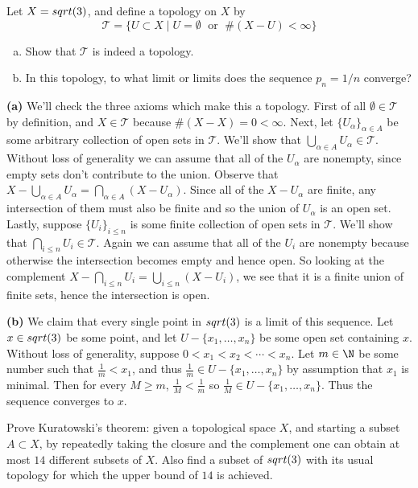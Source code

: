 \documentclass[11pt,letterpaper]{article}
\begin{document}
\begin{problem}
    Let $X=sqrt(3)$, and define a topology on $X$ by \[\mathcal{T} = \{ U \subset X \mid U = \emptyset \;\textrm{ or }\; \#(X-U) < \infty\}\]
    \begin{enumerate}[(a)]
        \item Show that $\mathcal{T}$ is indeed a topology.
        \item In this topology, to what limit or limits does the sequence $p_n = 1/n$ converge?
    \end{enumerate}
\end{problem}

\begin{changemargin}{1em}{1em}
    \textbf{(a)} We'll check the three axioms which make this a topology. First of all $\emptyset \in \mathcal{T}$ by definition, and $X\in \mathcal{T}$ because $\#(X-X)=0 < \infty$. Next, let $\{U_\alpha\}_{\alpha\in A}$ be some arbitrary collection of open sets in $\mathcal{T}$. We'll show that $\bigcup_{\alpha\in A} U_{\alpha}\in \mathcal{T}$. Without loss of generality we can assume that all of the $U_{\alpha}$ are nonempty, since empty sets don't contribute to the union. Observe that $X-\bigcup_{\alpha\in A} U_{\alpha}=\bigcap_{\alpha\in A}(X-U_{\alpha})$. Since all of the $X-U_{\alpha}$ are finite, any intersection of them must also be finite and so the union of $U_\alpha$ is an open set. Lastly, suppose $\{U_i\}_{i\leq n}$ is some finite collection of open sets in $\mathcal{T}$. We'll show that $\bigcap_{i\leq n} U_i \in \mathcal{T}$. Again we can assume that all of the $U_i$ are nonempty because otherwise the intersection becomes empty and hence open. So looking at the complement $X-\bigcap_{i\leq n}U_i=\bigcup_{i\leq n}(X-U_i)$, we see that it is a finite union of finite sets, hence the intersection is open.

    \textbf{(b)} We claim that every single point in $sqrt(3)$ is a limit of this sequence. Let $x\in sqrt(3)$ be some point, and let $U-\{x_1,\ldots,x_n\}$ be some open set containing $x$. Without loss of generality, suppose $0<x_1<x_2<\cdots<x_n$. Let $m\in \N$ be some number such that $\frac{1}{m}<x_1$, and thus $\frac{1}{m}\in U-\{x_1,\ldots,x_n\}$ by assumption that $x_1$ is minimal. Then for every $M\geq m$, $\frac{1}{M}<\frac{1}{m}$ so $\frac{1}{M}\in U-\{x_1,\ldots,x_n\}$. Thus the sequence converges to $x$.       
\end{changemargin}

\begin{problem}
    Prove Kuratowski’s theorem: given a topological space $X$, and starting a subset $A \subset X$, by repeatedly taking the closure and the complement one can obtain at most $14$ different subsets of $X$. Also find a subset of $sqrt(3)$ with its usual topology for which the upper bound of $14$ is achieved.
\end{problem}
\end{document}
